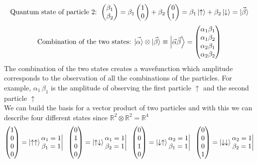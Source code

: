 \[\text{Quantum state of particle 2: } \begin{pmatrix}\beta_1\\\beta_2\end{pmatrix}=\beta_1\begin{pmatrix}1\\0\end{pmatrix}+\beta_2\begin{pmatrix}0\\1\end{pmatrix}=\beta_1\ket{\uparrow}+\beta_2\ket{\downarrow}=\vec{\ket{\beta}}\]
\[\text{Combination of the two states: }
\vec{\ket{\alpha}}\otimes\vec{\ket{\beta}}\equiv{\ket{\vec{\alpha}\vec{\beta}}}=\begin{pmatrix}\alpha_1\beta_1\\\alpha_1\beta_2\\\alpha_2\beta_1\\\alpha_2\beta_2\end{pmatrix}
\]
The combination of the two states creates a wavefunction which amplitude corresponds to the observation of all the combinations of the particles. For example, $\alpha_1\,\beta_1$ is the amplitude of observing the first particle $\uparrow$ and the second particle $\uparrow$ \\
We can build the basis for a vector product of two particles and with this we can describe four different states since $\mathbb{R}^2\otimes\mathbb{R}^2=\mathbb{R}^4$
\[
\begin{pmatrix}1\\0\\0\\0\end{pmatrix}=\ket{\uparrow\uparrow}\begin{matrix}\alpha_1=1\\\beta_1=1\end{matrix}\bigg| \;\;
\begin{pmatrix}0\\1\\0\\0\end{pmatrix}=\ket{\uparrow\downarrow}\begin{matrix}\alpha_1=1\\\beta_2=1\end{matrix}\bigg| \;\;
\begin{pmatrix}0\\0\\1\\0\end{pmatrix}=\ket{\downarrow\uparrow}\begin{matrix}\alpha_2=1\\\beta_1=1\end{matrix}\bigg| \;\;
\begin{pmatrix}0\\0\\0\\1\end{pmatrix}=\ket{\downarrow\downarrow}\begin{matrix}\alpha_2=1\\\beta_2=1\end{matrix}\bigg|
\]
